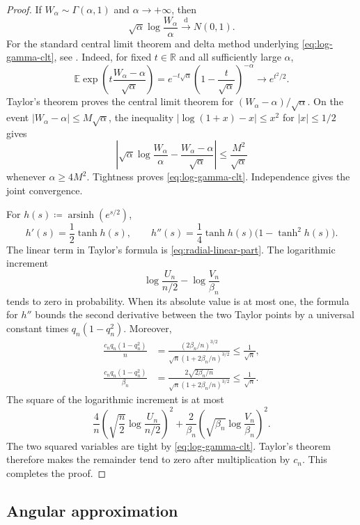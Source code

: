 \documentclass[10pt,a4paper]{amsart}
\numberwithin{equation}{section}
\newcommand{\R}{\mathbb R}
\DeclareMathOperator{\arsinh}{arsinh}
\begin{document}
\begin{proof}
If $W_\alpha\sim\Gamma(\alpha,1)$ and $\alpha\to+\infty$, then
\begin{equation}\label{eq:log-gamma-clt} \sqrt\alpha\log\frac{W_\alpha}{\alpha} \overset{\mathrm{d}}{\longrightarrow} N(0,1). \end{equation}
For the standard central limit theorem and delta method underlying
\eqref{eq:log-gamma-clt}, see \cite{billingsley1995probability}.
Indeed, for fixed $t\in\R$ and all sufficiently large $\alpha$,
\[ \mathbb E\exp\left(t\frac{W_\alpha-\alpha}{\sqrt\alpha}\right) =e^{-t\sqrt\alpha}\left(1-\frac{t}{\sqrt\alpha}\right)^{-\alpha} \longrightarrow e^{t^2/2}. \]
Taylor's theorem proves the central limit theorem for $(W_\alpha-\alpha)/\sqrt\alpha$.  On the event $|W_\alpha-\alpha|\le M\sqrt\alpha$, the inequality $|\log(1+x)-x|\le x^2$ for $|x|\le1/2$ gives
\[ \left|\sqrt\alpha\log\frac{W_\alpha}{\alpha} -\frac{W_\alpha-\alpha}{\sqrt\alpha}\right| \le\frac{M^2}{\sqrt\alpha} \]
whenever $\alpha\ge4M^2$.  Tightness proves \eqref{eq:log-gamma-clt}.  Independence gives the joint convergence.

For $h(s)\coloneqq\arsinh(e^{s/2})$,
\[ h'(s)=\frac12\tanh h(s), \qquad h''(s)=\frac14\tanh h(s)\bigl(1-\tanh^2h(s)\bigr). \]
The linear term in Taylor's formula is \eqref{eq:radial-linear-part}.  The logarithmic increment
\[ \log\frac{U_n}{n/2}-\log\frac{V_n}{\beta_n} \]
tends to zero in probability.  When its absolute value is at most one, the formula for $h''$ bounds the second derivative between the two Taylor points by a universal constant times $q_n(1-q_n^2)$.  Moreover,
\begin{align*}
 \frac{c_nq_n(1-q_n^2)}{n}
 &=\frac{(2\beta_n/n)^{3/2}}
 {\sqrt n(1+2\beta_n/n)^{3/2}}
 \le\frac1{\sqrt n},\\
 \frac{c_nq_n(1-q_n^2)}{\beta_n}
 &=\frac{2\sqrt{2\beta_n/n}}
 {\sqrt n(1+2\beta_n/n)^{3/2}}
 \le\frac1{\sqrt n}.
\end{align*}
The square of the logarithmic increment is at most
\[ \frac4n\left(\sqrt{\frac n2}\log\frac{U_n}{n/2}\right)^2 +\frac2{\beta_n} \left(\sqrt{\beta_n}\log\frac{V_n}{\beta_n}\right)^2. \]
The two squared variables are tight by \eqref{eq:log-gamma-clt}.  Taylor's theorem therefore makes the remainder tend to zero after multiplication by $c_n$.  This completes the proof.
\end{proof}

\subsection{Angular approximation}
\end{document}
